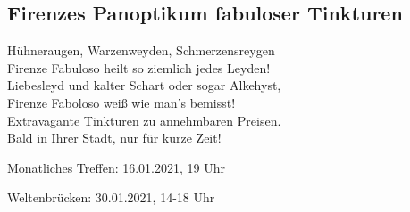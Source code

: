 \documentclass[final]{multiversum}
\begin{document}
\subsection{Firenzes Panoptikum fabuloser Tinkturen}
Hühneraugen, Warzenweyden, Schmerzensreygen\\
Firenze Fabuloso heilt so ziemlich jedes Leyden!\\
Liebesleyd und kalter Schart oder sogar Alkehyst,\\
Firenze Faboloso weiß wie man's bemisst!\\[1em]
Extravagante Tinkturen zu annehmbaren Preisen.\\
Bald in Ihrer Stadt, nur für kurze Zeit! 

\begin{termine}
\item Monatliches Treffen: 16.01.2021, 19 Uhr
\item Weltenbrücken: 30.01.2021, 14-18 Uhr
\end{termine}
\impressum
\end{document}
